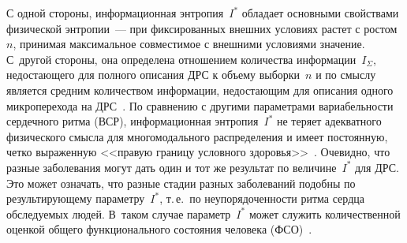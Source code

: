 \begin{multicols}{2}
  С одной стороны, информационная энтропия~$I^*$ обладает основными 
свойствами физической энтропии~--- при фиксированных внешних условиях 
растет с ростом~$n$, принимая максимальное со\-вмес\-ти\-мое с внешними 
условиями значение. С~другой стороны, она определена отношением 
количества информации~$I_\Sigma$, недостающего для полного описания ДРС 
к объему выборки~$n$ и по смыс\-лу является средним количеством 
информации, недостающим для описания одного микроперехода на 
ДРС~\cite{6ku}. По сравнению с другими параметрами вариабельности 
сердечного ритма (ВСР), информационная энтропия~$I^*$ не теряет 
адекватного физического смыс\-ла для многомодального распределения и имеет 
постоянную, четко выраженную <<правую границу условного 
здоровья>>~\cite{6ku}. Очевидно, что разные заболевания могут дать один и 
тот же результат по величине~$I^*$ для ДРС. Это может означать, что разные 
стадии разных заболеваний подобны по результирующему параметру~$I^*$, 
т.\,е.\ по неупорядоченности ритма сердца обследуемых людей. В~таком случае 
параметр~$I^*$ может служить количественной оценкой общего 
функционального состояния человека (ФСО)~\cite{6ku}.
\end{multicols}

  \begin{figure} %
  \vspace*{1pt}
\begin{center}
\mbox{%
\epsfxsize=162.85mm
}
\end{center}
\vspace*{-6pt}
  \vspace*{6pt}
  \end{figure}
  
